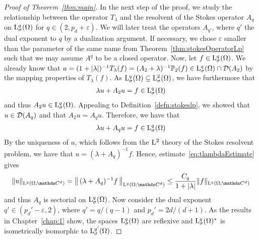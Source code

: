 \begin{proof}[Proof of Theorem~\ref{thm:main}]
  In the next step of the proof, we study the relationship between the operator $T_\lambda$ and the resolvent of the Stokes operator $A_q$ on $\mathrm{L}^q_\sigma(\Omega)$ for $q \in (2, p_d + \varepsilon)$.
  We will later treat the operators $A_{q'}$, where $q'$ the dual exponent to $q$ by a dualization argument.
  If necessary, we chose $\varepsilon$ smaller than the parameter of the same name from Theorem~\ref{thm:stokesOperatorLp} such that we may assume $A^q$ to be a closed operator.
  Now, let $f \in \mathrm{L}^q_\sigma(\Omega)$.
  We already know that $u = (1 + |\lambda|)^{-1} T_\lambda(f) = (A_2 + \lambda)^{-1} \mathbb{P}_2(f) \in \mathrm{L}^q_\sigma(\Omega) \cap \mathcal{D}(A_2)$  by the mapping properties of $T_\lambda(f)$.
  As $\mathrm{L}^q_\sigma(\Omega) \subseteq \mathrm{L}^2_\sigma(\Omega)$, we have furthermore that
  \begin{align*}
    \lambda u + A_2 u = f \in \mathrm{L}^q_\sigma(\Omega)
  \end{align*}
  and thus $A_2 u \in \mathrm{L}^q_\sigma(\Omega)$.
  Appealing to Definition~\ref{defn:stokeslp}, we showed that $u \in \mathcal{D}(A_q)$ and that $A_2u = A_q u$. 
  Therefore, we have that
  \begin{align*}
    \lambda u + A_q u = f \in \mathrm{L}^q_\sigma(\Omega)
  \end{align*}
  By the uniqueness of $u$, which follows from the $\mathrm{L}^2$ theory of the Stokes resolvent problem, we have that $u = (\lambda + A_q)^{-1} f$.
  Hence, estimate~\eqref{eq:tlambdaEstimate} gives
  \begin{align*}
    \|u\|_{\Ell^q(\Omega; \C^d)} 
    = \big\|\,(\lambda + A_q)^{-1}f \,\big\|_{\Ell^q(\Omega; \C^d)}
    \leq \frac{C_q}{ 1 + |\lambda|} \|f\|_{\Ell^q(\Omega; \C^d)}
  \end{align*}
  and thus $A_q$ is sectorial on $\mathrm{L}^q_\sigma(\Omega)$.
  Now consider the dual exponent $q' \in (p_d' - \varepsilon, 2)$, where $q' = q / (q - 1)$ and $p_d' = 2d / (d + 1)$.
  As the results in Chapter~\ref{chap:1} show, the spaces $\mathrm{L}^q_\sigma(\Omega)$ are reflexive and $\mathrm{L}^q_\sigma(\Omega)^*$ is isometrically isomorphic to $\mathrm{L}^{q'}_\sigma(\Omega)$.%

\end{proof}
